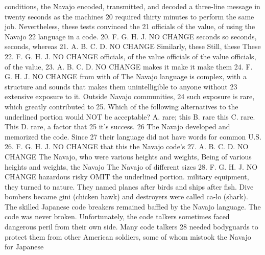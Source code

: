 conditions, the Navajo encoded, transmitted, and decoded
a three-line message in twenty seconds as the machines
20
required thirty minutes to perform the same job.
Nevertheless, these tests convinced the
21
officials of the value, of using the Navajo
22
language in a code.
20. F.
G.
H.
J. NO CHANGE
seconds so
seconds,
seconds, whereas
21. A.
B.
C.
D. NO CHANGE
Similarly, these
Still, these
These
22. F.
G.
H.
J. NO CHANGE
officials, of the value
officials of the value
officials, of the value,
23. A.
B.
C.
D. NO CHANGE
makes it
make it
make them
24. F.
G.
H.
J. NO CHANGE
from
with
of
The Navajo language is complex, with a structure and
sounds that makes them unintelligible to anyone without
23
extensive exposure to it. Outside Navajo communities,
24
such exposure is rare, which greatly contributed to
25. Which of the following alternatives to the underlined
portion would NOT be acceptable?
A. rare; this
B. rare this
C. rare. This
D. rare, a factor that
25
it’s success.
26
The Navajo developed and memorized the code. Since
27
their language did not have words for common U.S.
26. F.
G.
H.
J. NO CHANGE
that
this
the Navajo code’s
27. A.
B.
C.
D. NO CHANGE
The Navajo, who were various heights and weights,
Being of various heights and weights, the Navajo
The Navajo of different sizes
28. F.
G.
H.
J. NO CHANGE
hazardous
risky
OMIT the underlined portion.
military equipment, they turned to nature. They named
planes after birds and ships after fish. Dive bombers
became gini (chicken hawk) and destroyers were called
ca-lo (shark). The skilled Japanese code breakers remained
baffled by the Navajo language. The code was never
broken.
Unfortunately, the code talkers sometimes faced
dangerous peril from their own side. Many code talkers
28
needed bodyguards to protect them from other American
soldiers, some of whom mistook the Navajo for Japanese




\endinput

